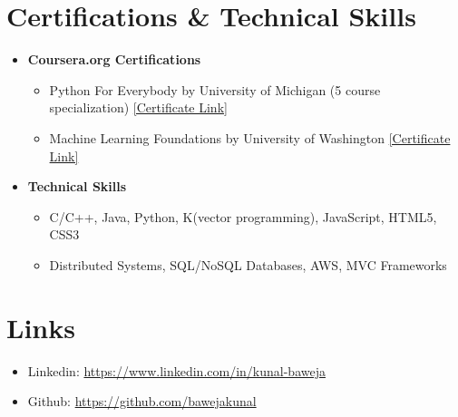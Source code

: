 \documentclass{article}
\newcommand{\bi}{\vspace{-1mm}\begin{itemize}[align=left,leftmargin=*, rightmargin=80pt, labelindent=0pt,labelsep=2pt, label={-}, nosep]}
\newcommand{\ei}{\end{itemize}}
\begin{document}

\vspace{-2mm}
\section*{Certifications \& Technical Skills}
\begin{itemize}
    \item \textbf{Coursera.org Certifications}
    \bi
        \item Python For Everybody by University of Michigan (5 course specialization) \href{https://www.coursera.org/account/accomplishments/specialization/2B5PCJGZ9WEE}{[Certificate Link]}

        \item Machine Learning Foundations by University of Washington \href{https://www.coursera.org/account/accomplishments/certificate/NDVXWMCYKX9N}{[Certificate Link]}
    \ei

    \item \textbf{Technical Skills}
    \bi
        \item C/C++, Java, Python, K(vector programming), JavaScript, HTML5, CSS3
        \item Distributed Systems, SQL/NoSQL Databases, AWS, MVC Frameworks
    \ei
\end{itemize}

\vspace{-2mm}
\section*{Links}
\begin{itemize}[nosep]
    \item Linkedin: \href{https://www.linkedin.com/in/kunal-baweja}{https://www.linkedin.com/in/kunal-baweja}
    \item Github: \href{https://github.com/bawejakunal}{https://github.com/bawejakunal}
\end{itemize}
\end{document}
